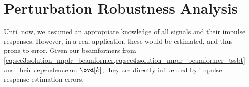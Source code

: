\section{Perturbation Robustness Analysis}
\label{sec:perturbation_analysis}
Until now, we assumed an appropriate knowledge of all signals and their impulse responses. However, in a real application these would be estimated, and thus prone to error. Given our beamformers from \cref{eq:sec3:solution_mpdr_beamformer,eq:sec4:solution_mpdr_beamformer_tssbt} and their dependence on $\bvd[k]$, they are directly influenced by impulse response estimation errors.

